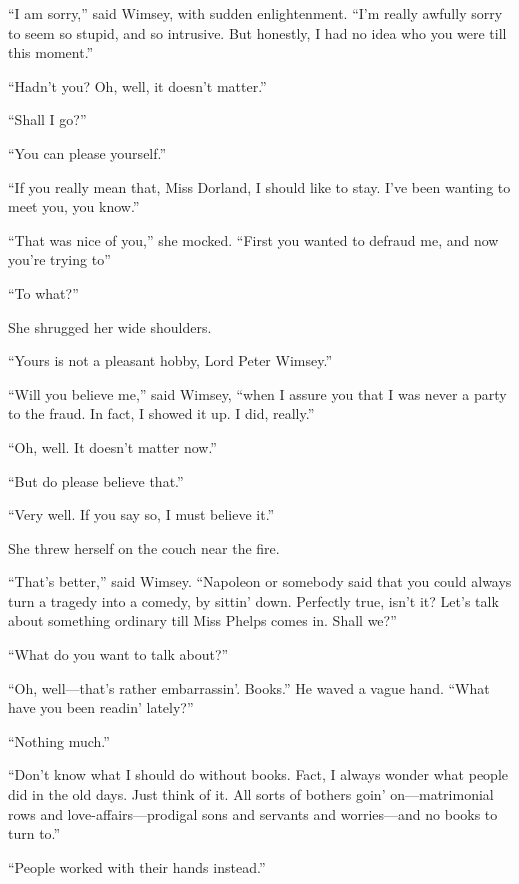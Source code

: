 \enquote{I am sorry,} said Wimsey, with sudden enlightenment. \enquote{I'm really awfully sorry to seem so stupid, and so intrusive. But honestly, I had no idea who you were till this moment.}

\enquote{Hadn't you? Oh, well, it doesn't matter.}

\enquote{Shall I go?}

\enquote{You can please yourself.}

\enquote{If you really mean that, Miss Dorland, I should like to stay. I've been wanting to meet you, you know.}

\enquote{That was nice of you,} she mocked. \enquote{First you wanted to defraud me, and now you're trying to\longdash}

\enquote{To what?}

She shrugged her wide shoulders.

\enquote{Yours is not a pleasant hobby, Lord Peter Wimsey.}

\enquote{Will you believe me,} said Wimsey, \enquote{when I assure you that I was never a party to the fraud. In fact, I showed it up. I did, really.}

\enquote{Oh, well. It doesn't matter now.}

\enquote{But do please believe that.}

\enquote{Very well. If you say so, I must believe it.}

She threw herself on the couch near the fire.

\enquote{That's better,} said Wimsey. \enquote{Napoleon or somebody said that you could always turn a tragedy into a comedy, by sittin' down. Perfectly true, isn't it? Let's talk about something ordinary till Miss Phelps comes in. Shall we?}

\enquote{What do you want to talk about?}

\enquote{Oh, well\allowbreak---\allowbreak that's rather embarrassin'. Books.} He waved a vague hand. \enquote{What have you been readin' lately?}

\enquote{Nothing much.}

\enquote{Don't know what I should do without books. Fact, I always wonder what people did in the old days. Just think of it. All sorts of bothers goin' on\allowbreak---\allowbreak matrimonial rows and love-affairs\allowbreak---\allowbreak prodigal sons and servants and worries\allowbreak---\allowbreak and no books to turn to.}

\enquote{People worked with their hands instead.}

